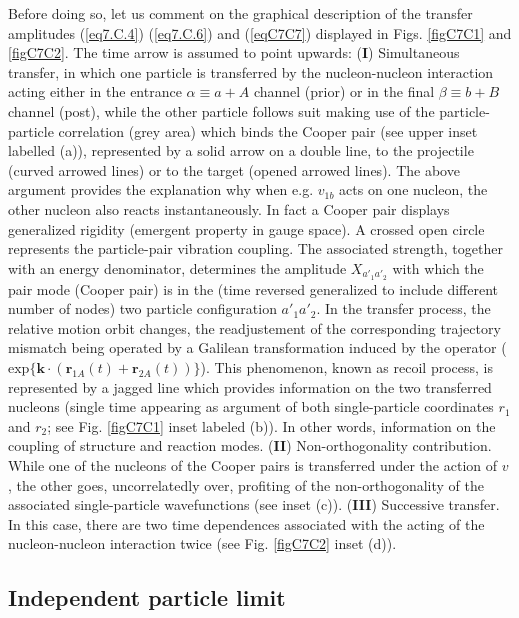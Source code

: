 Before doing so, let us comment on the graphical description of the transfer amplitudes (\ref{eq7.C.4}) (\ref{eq7.C.6}) and (\ref{eqC7C7}) displayed in Figs. \ref{figC7C1}
and \ref{figC7C2}. The time arrow is assumed to point upwards:
(\textbf{I}) Simultaneous transfer, in which one particle is transferred by the nucleon-nucleon interaction acting either in the entrance $\alpha \equiv a+A$ channel (prior) or in the final $\beta \equiv b + B$ channel (post), while the other particle follows suit making use of the particle-particle correlation (grey area) which binds the Cooper pair (see upper inset labelled (a)), represented by a solid arrow on a double line, to the projectile (curved arrowed lines) or to the target (opened arrowed lines). The above argument provides the explanation why when e.g. $v_{1b}$ acts on one nucleon, the other nucleon also reacts instantaneously. In fact a Cooper pair displays generalized rigidity (emergent property in gauge space).
A crossed open circle represents the particle-pair vibration coupling. The associated strength, together with an energy denominator, determines the amplitude $X_{a'_1 a'_2}$  with which the pair mode (Cooper pair) is in the (time reversed generalized to include different number of nodes) two particle configuration $a'_1 a'_2$. In the transfer process, the  relative motion orbit changes, the readjustement of the corresponding trajectory mismatch being operated by a Galilean transformation induced by the operator ($\textrm{exp}\{ \mathbf k \cdot (\mathbf{r}_{1A}(t)+\mathbf{r}_{2A}(t))\}$). This phenomenon, known as recoil process, is represented by a jagged line which  provides  information on the two transferred nucleons (single time appearing as argument of both single-particle coordinates $r_1$ and $r_2$; see Fig. \ref{figC7C1} inset labeled (b)). In other words, information on the coupling of structure and reaction modes.
(\textbf{II}) Non-orthogonality contribution. While one of the nucleons of the Cooper pairs is transferred under the action of $v$, the other goes, uncorrelatedly over, profiting of the non-orthogonality of the associated single-particle wavefunctions (see inset (c)). 
(\textbf{III}) Successive transfer. In this case, there are two time dependences associated with the acting of the nucleon-nucleon interaction twice (see Fig. \ref{figC7C2} inset (d)). 


\subsection{Independent particle limit}\label{C7S7C1}

